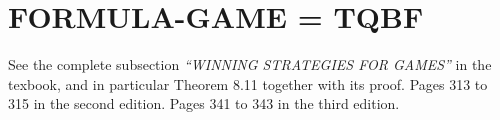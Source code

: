 \section{FORMULA-GAME = TQBF}

See the complete subsection \emph{``WINNING STRATEGIES FOR GAMES''} in the
texbook, and in particular Theorem 8.11 together with its proof.
Pages 313 to 315 in the second edition. Pages 341 to 343 in the third
edition.
